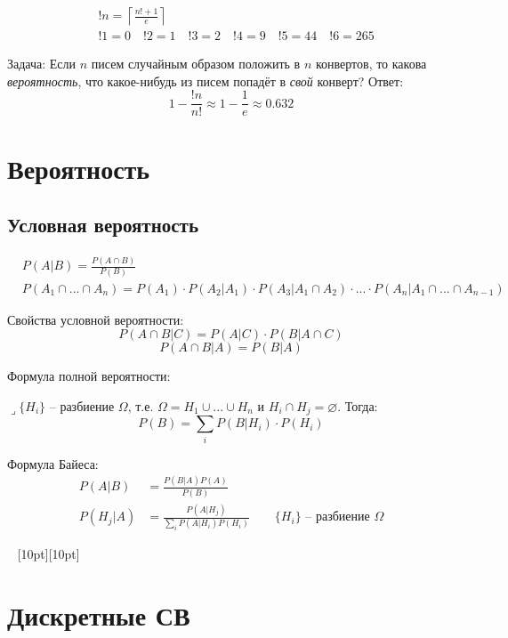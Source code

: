 \documentclass[a4paper,12pt,fleqn]{article}
\newenvironment{onsamepage} {\begin{minipage}{\textwidth}} {\end{minipage}}
\numberwithin{figure}{section}
\theoremstyle{definition}
\def\lets{{\huge$\lrcorner$}\space}
\def\vignette{\vspace{48pt} \noindent \hrulefill~
	          \raisebox{-8pt}[10pt][10pt]{\Huge\ding{102}}
	          ~\hrulefill}
\begin{document}
\begin{align*}
&	!n = \left\lceil \frac{n!+1}{e} \right\rceil \\
& 	!1 = 0		\quad
	!2 = 1		\quad
	!3 = 2		\quad
	!4 = 9		\quad
	!5 = 44		\quad
	!6 = 265
\end{align*}

Задача: Если $n$ писем случайным образом положить в $n$ конвертов, то какова \textit{вероятность}, что какое-нибудь из писем попадёт в \textit{свой} конверт?
Ответ: \[ 1-\frac{!n}{n!} \approx 1-\frac1e \approx 0.632 \]


\section{Вероятность}

\subsection{Условная вероятность}

\begin{onsamepage}
\begin{align*}
&	P(A|B) = \frac{P(A \cap B)}{P(B)}
\\&	P(A_1 \cap ... \cap A_n)
	= P(A_1) \cdot P(A_2|A_1) \cdot P(A_3|A_1 \cap A_2)
	  \cdot ... \cdot P(A_n|A_1 \cap ... \cap A_{n-1})
\end{align*}

Свойства условной вероятности:
\[ P(A \cap B|C) = P(A|C) \cdot P(B|A \cap C) \]
\[ P(A \cap B|A) = P(B|A) \]
\end{onsamepage}

Формула полной вероятности:

\lets $\{H_i\}$ -- разбиение $\Omega$, т.е.
$\Omega = H_1 \cup ... \cup H_n$ и $H_i \cap H_j = \varnothing$.
Тогда:
\[ P(B) = \sum_i P(B|H_i) \cdot P(H_i)  \]

Формула Байеса:
\begin{align*}
P(A|B) &= \frac{P(B|A) P(A)}{P(B)} \\
P(H_j|A) &= \frac{P(A|H_j)}{\sum_i P(A|H_i) P(H_i)}
			\qquad \{H_i\} \text{ -- разбиение } \Omega
\end{align*}


\vignette
\section{Дискретные СВ}
\end{document}
